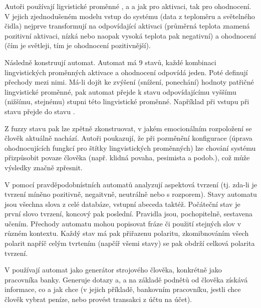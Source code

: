 \documentclass[a4paper,10pt]{article}
\begin{document}
Autoři používají ligvistické proměnné ,  a  a jak pro aktivaci, tak pro ohodnocení. V jejich zjednodušeném modelu vstup do systému (data z teploměru a světelného čidla) nejprve transformují na odpovídající aktivaci (průměrná teplota znamená pozitivní aktivaci, nízká nebo naopak vysoká teplota pak negativní) a ohodnocení (čím je světleji, tím je ohodnocení pozitivnější).

Následně konstruují automat. Automat má 9 stavů, každé kombinaci lingvistických proměnných aktivace a ohodnocení odpovídá jeden. Poté definují přechody mezi nimi. Má-li dojít ke zvýšení (snížení, ponechání) hodnoty patřičné lingvistické proměnné, pak automat přejde k stavu odpovídajícímu vyššímu (nižšímu, stejnému) stupni této lingvistické proměnné. Například při vstupu  při stavu  přejde do stavu . 

Z fuzzy stavu pak lze zpětně zkonstruovat, v jakém emocionálním rozpoložení se člověk aktuálně nachází. Autoři poukazují, že při pozměnění konfigurace (úprava ohodnocujících fungkcí pro štítky lingvistických proměnných) lze chování systému přizpůsobit povaze člověka (např. klidná povaha, pesimista a podob.), což může výsledky značně zpřesnit.


V \cite{Cas+-ProAutAspBasSenAna} pomocí pravděpodobnístních automatů analyzují aspektová tvrzení (tj. zda-li je tvrzení míněno pozitivně, negaitvně, neutrálně nebo s rozporem). Stavy automatu jsou všechna slova z celé databáze, vstupní abeceda taktéž. Počáteční stav je první slovo tvrzení, koncový pak poslední. Pravidla jsou, pochopitelně, sestavena učením. Přechody automatu mohou popisovat fráze či použití stejných slov v různém kontextu. Každý stav má pak přiřazenu polaritu, zkomibnováním všech polarit napříč celým tvrtením (napčíř všemi stavy) se pak obdrží celková polarita tvrzení.

V \cite{SchYou-ProSimHumMacDia} používají automat jako generátor strojového člověka, konkrétně jako pracovníka banky. Generuje dotazy a, a na základě podnětů od člověka získává informace, co a jak chce (v jejich příkladě, bankovním pracovníku, jestli chce člověk vybrat peníze, nebo provést transakci z účtu na účet). 


\end{document}
